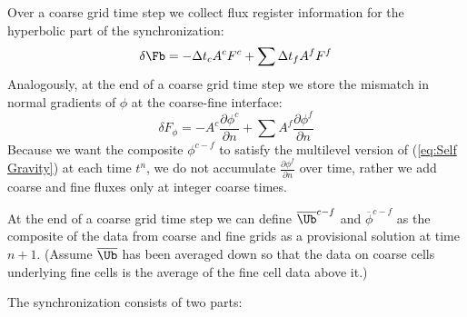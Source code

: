 Over a coarse grid time step 
we collect flux register information for the hyperbolic part of the synchronization:
\begin{equation}
\delta\Fb = -\Delta t_c A^c F^c + \sum \Delta t_f A^f F^f
\end{equation}
Analogously, at the end of a coarse grid time step 
we store the mismatch in normal gradients of $\phi$ at the coarse-fine interface:
\begin{equation}
\delta F_\phi =  - A^c \frac{\partial \phi^c}{\partial n}
+ \sum A^f \frac{\partial \phi^f}{\partial n}
\end{equation}
Because we want the composite $\phi^{c-f}$ to satisfy the multilevel version of  (\ref{eq:Self Gravity}) at each time $t^n$, we do not accumulate $\frac{\partial \phi^f}{\partial n}$ over time, rather we add coarse and fine fluxes only at integer coarse times.

At the end of a coarse grid time step we can define
${\overline{\Ub}}^{c-f}$ and $\overline{\phi}^{c-f}$
as the composite of the data from coarse and fine grids as a provisional solution at
time $n+1$. (Assume $\overline{\Ub}$ has been averaged down so that the data on coarse cells
underlying fine cells is the average of the fine cell data above it.)

The synchronization consists of two parts: 

